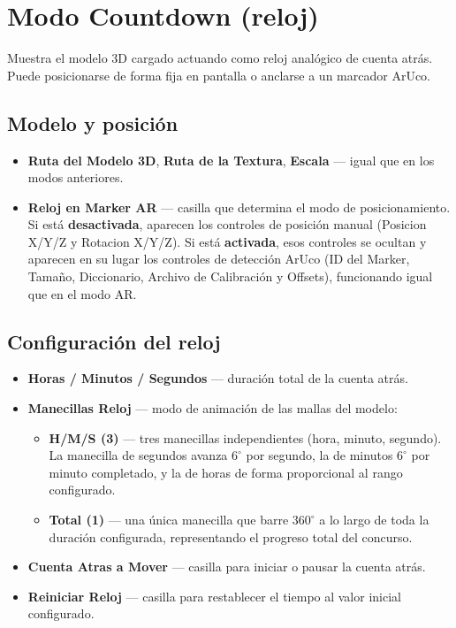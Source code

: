 \section*{Modo Countdown (reloj)}

Muestra el modelo 3D cargado actuando como reloj analógico de cuenta atrás. Puede posicionarse de forma fija en pantalla o anclarse a un marcador ArUco.

\subsection*{Modelo y posición}

\begin{itemize}
  \item \textbf{Ruta del Modelo 3D}, \textbf{Ruta de la Textura}, \textbf{Escala} — igual que en los modos anteriores.
  \item \textbf{Reloj en Marker AR} — casilla que determina el modo de posicionamiento. Si está \textbf{desactivada}, aparecen los controles de posición manual (Posicion X/Y/Z y Rotacion X/Y/Z). Si está \textbf{activada}, esos controles se ocultan y aparecen en su lugar los controles de detección ArUco (ID del Marker, Tamaño, Diccionario, Archivo de Calibración y Offsets), funcionando igual que en el modo AR.
\end{itemize}

\subsection*{Configuración del reloj}

\begin{itemize}
  \item \textbf{Horas / Minutos / Segundos} — duración total de la cuenta atrás.
  \item \textbf{Manecillas Reloj} — modo de animación de las mallas del modelo:
    \begin{itemize}
      \item \textbf{H/M/S (3)} — tres manecillas independientes (hora, minuto, segundo). La manecilla de segundos avanza $6^\circ$ por segundo, la de minutos $6^\circ$ por minuto completado, y la de horas de forma proporcional al rango configurado.
      \item \textbf{Total (1)} — una única manecilla que barre $360^\circ$ a lo largo de toda la duración configurada, representando el progreso total del concurso.
    \end{itemize}
  \item \textbf{Cuenta Atras a Mover} — casilla para iniciar o pausar la cuenta atrás.
  \item \textbf{Reiniciar Reloj} — casilla para restablecer el tiempo al valor inicial configurado.
\end{itemize}

